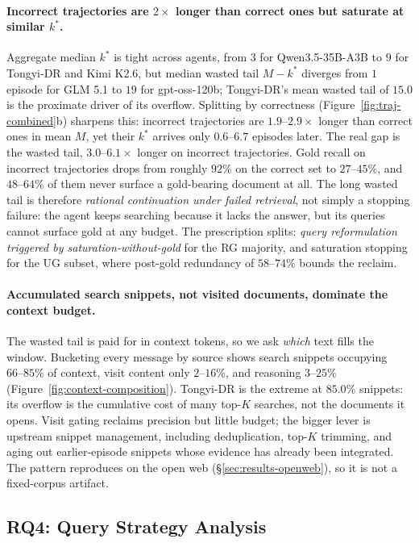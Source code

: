 \paragraph{Incorrect trajectories are $2\times$ longer than correct ones but saturate at similar $k^*$.} Aggregate median $k^*$ is tight across agents, from $3$ for Qwen3.5-35B-A3B to $9$ for Tongyi-DR and Kimi K2.6, but median wasted tail $M-k^*$ diverges from $1$ episode for GLM 5.1 to $19$ for gpt-oss-120b; Tongyi-DR's mean wasted tail of $15.0$ is the proximate driver of its overflow. Splitting by correctness (Figure~\ref{fig:traj-combined}b) sharpens this: incorrect trajectories are $1.9\text{--}2.9\times$ longer than correct ones in mean $M$, yet their $k^*$ arrives only $0.6\text{--}6.7$ episodes later. The real gap is the wasted tail, $3.0\text{--}6.1\times$ longer on incorrect trajectories. Gold recall on incorrect trajectories drops from roughly $92\%$ on the correct set to $27\text{--}45\%$, and $48\text{--}64\%$ of them never surface a gold-bearing document at all. The long wasted tail is therefore \emph{rational continuation under failed retrieval}, not simply a stopping failure: the agent keeps searching because it lacks the answer, but its queries cannot surface gold at any budget. The prescription splits: \emph{query reformulation triggered by saturation-without-gold} for the RG majority, and saturation stopping for the UG subset, where post-gold redundancy of $58\text{--}74\%$ bounds the reclaim.

\paragraph{Accumulated search snippets, not visited documents, dominate the context budget.} The wasted tail is paid for in context tokens, so we ask \emph{which} text fills the window. Bucketing every message by source shows search snippets occupying $66\text{--}85\%$ of context, visit content only $2\text{--}16\%$, and reasoning $3\text{--}25\%$ (Figure~\ref{fig:context-composition}). Tongyi-DR is the extreme at $85.0\%$ snippets: its overflow is the cumulative cost of many top-$K$ searches, not the documents it opens. Visit gating reclaims precision but little budget; the bigger lever is upstream snippet management, including deduplication, top-$K$ trimming, and aging out earlier-episode snippets whose evidence has already been integrated. The pattern reproduces on the open web (§\ref{sec:results-openweb}), so it is not a fixed-corpus artifact.

\subsection{RQ4: Query Strategy Analysis}
\label{sec:results-query}

